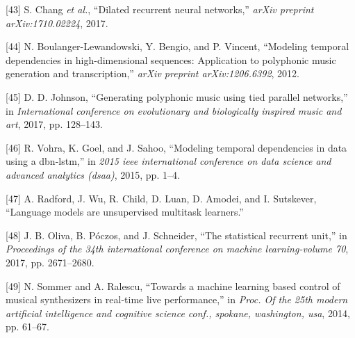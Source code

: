 \documentclass[12pt,]{article}
\begin{document}
\leavevmode\hypertarget{ref-chang2017dilated}{}%
{[}43{]} S. Chang \emph{et al.}, ``Dilated recurrent neural networks,''
\emph{arXiv preprint arXiv:1710.02224}, 2017.

\leavevmode\hypertarget{ref-boulanger2012modeling}{}%
{[}44{]} N. Boulanger-Lewandowski, Y. Bengio, and P. Vincent, ``Modeling
temporal dependencies in high-dimensional sequences: Application to
polyphonic music generation and transcription,'' \emph{arXiv preprint
arXiv:1206.6392}, 2012.

\leavevmode\hypertarget{ref-johnson2017generating}{}%
{[}45{]} D. D. Johnson, ``Generating polyphonic music using tied
parallel networks,'' in \emph{International conference on evolutionary
and biologically inspired music and art}, 2017, pp. 128--143.

\leavevmode\hypertarget{ref-vohra2015modeling}{}%
{[}46{]} R. Vohra, K. Goel, and J. Sahoo, ``Modeling temporal
dependencies in data using a dbn-lstm,'' in \emph{2015 ieee
international conference on data science and advanced analytics (dsaa)},
2015, pp. 1--4.

\leavevmode\hypertarget{ref-radford2018language}{}%
{[}47{]} A. Radford, J. Wu, R. Child, D. Luan, D. Amodei, and I.
Sutskever, ``Language models are unsupervised multitask learners.''

\leavevmode\hypertarget{ref-oliva2017statistical}{}%
{[}48{]} J. B. Oliva, B. Póczos, and J. Schneider, ``The statistical
recurrent unit,'' in \emph{Proceedings of the 34th international
conference on machine learning-volume 70}, 2017, pp. 2671--2680.

\leavevmode\hypertarget{ref-sommer2014towards}{}%
{[}49{]} N. Sommer and A. Ralescu, ``Towards a machine learning based
control of musical synthesizers in real-time live performance,'' in
\emph{Proc. Of the 25th modern artificial intelligence and cognitive
science conf., spokane, washington, usa}, 2014, pp. 61--67.
\end{document}
